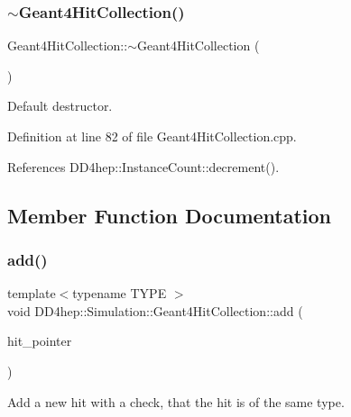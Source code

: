 \subsubsection{\texorpdfstring{$\sim$\+Geant4\+Hit\+Collection()}{~Geant4HitCollection()}}
{\footnotesize\ttfamily Geant4\+Hit\+Collection\+::$\sim$\+Geant4\+Hit\+Collection (\begin{DoxyParamCaption}{ }\end{DoxyParamCaption})\hspace{0.3cm}{\ttfamily [virtual]}}



Default destructor. 



Definition at line 82 of file Geant4\+Hit\+Collection.\+cpp.



References D\+D4hep\+::\+Instance\+Count\+::decrement().



\subsection{Member Function Documentation}
\hypertarget{class_d_d4hep_1_1_simulation_1_1_geant4_hit_collection_aeb5ededae3913d70a3aeecfa8ba0b853}{}\label{class_d_d4hep_1_1_simulation_1_1_geant4_hit_collection_aeb5ededae3913d70a3aeecfa8ba0b853} 
\subsubsection{\texorpdfstring{add()}{add()}\hspace{0.1cm}{\footnotesize\ttfamily [1/2]}}
{\footnotesize\ttfamily template$<$typename T\+Y\+PE $>$ \\
void D\+D4hep\+::\+Simulation\+::\+Geant4\+Hit\+Collection\+::add (\begin{DoxyParamCaption}\item[{T\+Y\+PE $\ast$}]{hit\+\_\+pointer }\end{DoxyParamCaption})\hspace{0.3cm}{\ttfamily [inline]}}



Add a new hit with a check, that the hit is of the same type. 



